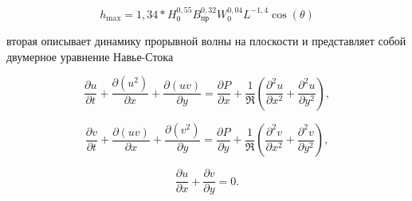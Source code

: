 \begin{equation}
h_{\max} = 1,34*H_{0}^{0,55}B_{пр}^{0,32}W_{0}^{0,04}L^{- 1,4}\cos(\theta)
\end{equation}

вторая описывает динамику прорывной волны на плоскости и представляет
собой двумерное уравнение Навье-Стока

\begin{equation}
\frac{\partial u}{\partial t} + \frac{\partial(u^{2})}{\partial x} + \frac{\partial(uv)}{\partial y} = \frac{\partial P}{\partial x} + \frac{1}{\Re}\left( \frac{\partial^{2}u}{\partial x^{2}} + \frac{\partial^{2}u}{\partial y^{2}} \right),
\end{equation}

\begin{equation}
\frac{\partial v}{\partial t} + \frac{\partial(uv)}{\partial x} + \frac{\partial(v^{2})}{\partial y} = \frac{\partial P}{\partial y} + \frac{1}{\Re}\left( \frac{\partial^{2}v}{\partial x^{2}} + \frac{\partial^{2}v}{\partial y^{2}} \right),
\end{equation}

\begin{equation}
\frac{\partial u}{\partial x} + \frac{\partial v}{\partial y} = 0.
\end{equation}

